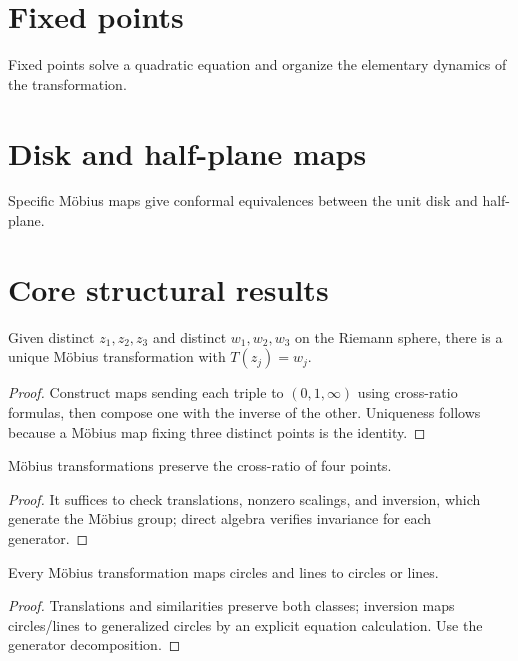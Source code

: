 \section{Fixed points}
Fixed points solve a quadratic equation and organize the elementary dynamics of the transformation.

\section{Disk and half-plane maps}
Specific Möbius maps give conformal equivalences between the unit disk and half-plane.

\section{Core structural results}

\begin{theorem}\label{thm:iv16-01}
Given distinct $z_1,z_2,z_3$ and distinct $w_1,w_2,w_3$ on the Riemann sphere, there is a unique Möbius transformation with $T(z_j)=w_j$.
\begin{proof}
Construct maps sending each triple to $(0,1,\infty)$ using cross-ratio formulas, then compose one with the inverse of the other. Uniqueness follows because a Möbius map fixing three distinct points is the identity.
\end{proof}
\end{theorem}

\begin{theorem}\label{thm:iv16-02}
Möbius transformations preserve the cross-ratio of four points.
\begin{proof}
It suffices to check translations, nonzero scalings, and inversion, which generate the Möbius group; direct algebra verifies invariance for each generator.
\end{proof}
\end{theorem}

\begin{theorem}\label{thm:iv16-03}
Every Möbius transformation maps circles and lines to circles or lines.
\begin{proof}
Translations and similarities preserve both classes; inversion maps circles/lines to generalized circles by an explicit equation calculation. Use the generator decomposition.
\end{proof}
\end{theorem}

